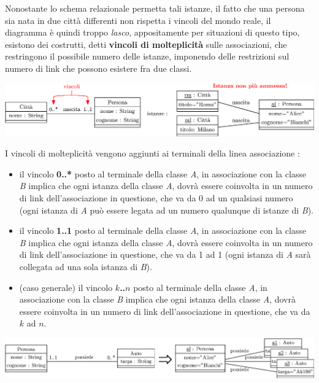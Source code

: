 \documentclass[12pt, letterpaper]{article}
\begin{document}
Nonostante lo schema relazionale permetta tali istanze, il fatto che una persona sia nata in due città differenti
non rispetta i vincoli del mondo reale, il diagramma è quindi troppo \textit{lasco}, appositamente per situazioni
di questo tipo, esistono dei costrutti, detti \textbf{vincoli di molteplicità} sulle associazioni, che restringono
il possibile numero delle istanze, imponendo delle restrizioni sul numero di link che possono esistere fra due classi.
\begin{center}
    \includegraphics[width=1\textwidth ]{images/molteplicita.eps}
\end{center}
I vincoli di molteplicità vengono aggiunti ai terminali della linea associazione : \begin{itemize}
    \item il vincolo \textbf{0..*} posto al terminale della classe \textit{A}, in associazione con la
          classe \textit{B} implica che ogni istanza della classe \textit{A}, dovrà essere coinvolta in un numero di link
          dell'associazione in questione, che va da 0 ad un qualsiasi numero (ogni istanza di \textit{A} può essere legata
          ad un numero qualunque di istanze di \textit{B}).
    \item il vincolo \textbf{1..1} posto al terminale della classe \textit{A}, in associazione con la
          classe \textit{B} implica che ogni istanza della classe \textit{A}, dovrà essere coinvolta in un numero di link
          dell'associazione in questione, che va da 1 ad 1 (ogni istanza di \textit{A} sarà collegata ad una sola
          istanza di \textit{B}).
    \item (caso generale) il vincolo \textbf{\(k\)..\(n\)} posto al terminale della classe \textit{A}, in associazione con la
          classe \textit{B} implica che ogni istanza della classe \textit{A}, dovrà essere coinvolta in un numero di link
          dell'associazione in questione, che va da \(k\) ad \(n\).
\end{itemize}\begin{center}
    \includegraphics[width=\textwidth ]{images/esempioAuto.eps}
\end{center}
\end{document}
